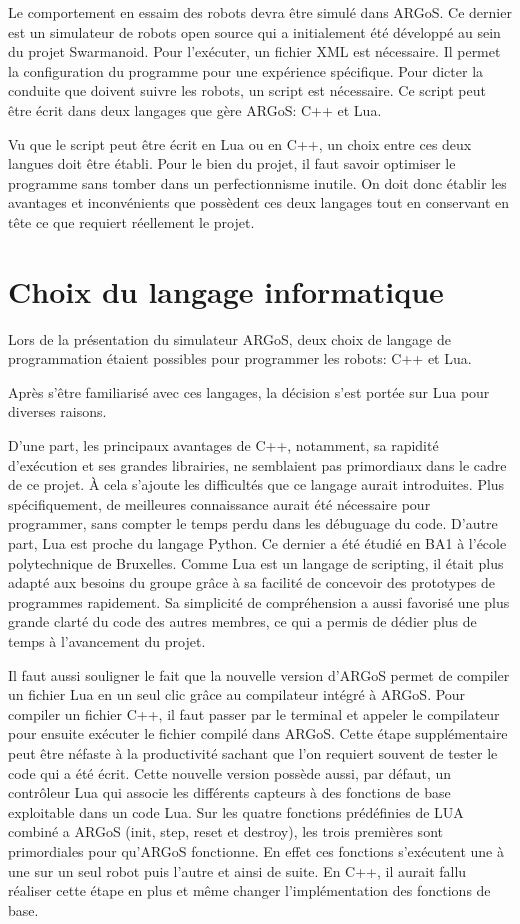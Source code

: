\documentclass[a4paper,11pt]{report}
\begin{document}
Le comportement en essaim des robots devra être simulé dans ARGoS. Ce dernier est un simulateur de robots open source qui a initialement été développé au sein du projet Swarmanoid. Pour l'exécuter, un fichier XML est nécessaire. Il permet la configuration du programme pour une expérience spécifique. Pour dicter la conduite que doivent suivre les robots, un script est nécessaire. Ce script peut être écrit dans deux langages que gère ARGoS: C++ et Lua.

Vu que le script peut être écrit en Lua ou en C++, un choix entre ces deux langues doit être établi. Pour le bien du projet, il faut savoir optimiser le programme sans tomber dans un perfectionnisme inutile. On doit donc établir les avantages et inconvénients que possèdent ces deux langages tout en conservant en tête ce que requiert réellement le projet.

\chapter{Choix du langage informatique}

Lors de la présentation du simulateur ARGoS, deux choix de langage de programmation étaient possibles pour programmer les robots: C++ et Lua.

Après s’être familiarisé avec ces langages, la décision s'est portée sur Lua pour diverses raisons.

D'une part, les principaux avantages de C++, notamment, sa rapidité d’exécution et ses grandes librairies, ne semblaient pas primordiaux dans le cadre de ce projet. À cela s'ajoute les difficultés que ce langage aurait introduites. Plus spécifiquement, de meilleures connaissance aurait été nécessaire pour programmer, sans compter le temps perdu dans les débuguage du code.
D'autre part, Lua est proche du langage Python. Ce dernier a été étudié en BA1 à l'école polytechnique de Bruxelles. Comme Lua est un langage de scripting, il était plus adapté aux besoins du groupe grâce à sa facilité de concevoir des prototypes de programmes rapidement. Sa simplicité de compréhension a aussi favorisé une plus grande clarté du code des autres membres, ce qui a permis de dédier plus de temps à l’avancement du projet.\cite{compC++,compLua}

Il faut aussi souligner le fait que la nouvelle version d'ARGoS permet de compiler un fichier Lua en un seul clic grâce au compilateur intégré à ARGoS. Pour compiler un fichier C++, il faut passer par le terminal et appeler le compilateur pour ensuite exécuter le fichier compilé dans ARGoS. Cette étape supplémentaire peut être néfaste à la productivité sachant que l'on requiert souvent de tester le code qui a été écrit. Cette nouvelle version possède aussi, par défaut, un contrôleur Lua qui associe les différents capteurs à des fonctions de base exploitable dans un code Lua. Sur les quatre fonctions prédéfinies de LUA combiné a ARGoS (init, step, reset et destroy), les trois premières sont primordiales pour qu'ARGoS fonctionne. En effet ces fonctions s’exécutent une à une sur un seul robot puis l'autre et ainsi de suite. En C++, il aurait fallu réaliser cette étape en plus et même changer l'implémentation des fonctions de base.
\end{document}
